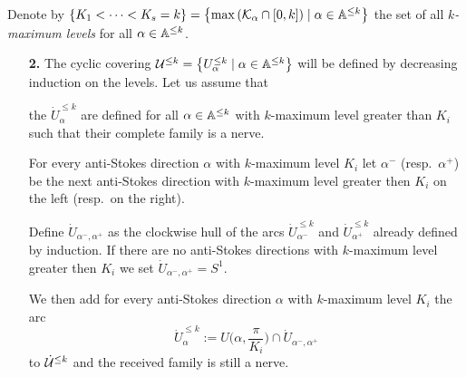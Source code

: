 Denote by $\left\{K_1<\cdots<K_s=k\right\}
=\left\{\max\left(\mathcal{K}_\alpha\cap[0,k]\right)\mid\alpha\in\mathbb{A}^{\leq k}\right\}$
the set of all \emph{$k$-maximum levels} for all $\alpha\in\mathbb{A}^{\leq k}$.
\begin{itemize}
\item[\textbf{2.}] The cyclic covering
  $\mathcal{U}^{\leq k}=\left\{U_\alpha^{\leq k}\mid\alpha\in\mathbb{A}^{\leq k}\right\}$
  will be defined by decreasing induction on the levels.
  Let us assume that
  \begin{einr}
    the $\dot U_\alpha^{\leq k}$ are defined for all $\alpha\in\mathbb{A}^{\leq k}$ with
    $k$-maximum level greater than $K_i$ such that their complete family is a
    nerve.
  \end{einr}
  For every anti-Stokes direction $\alpha$ with $k$-maximum level $K_i$ let
  $\alpha^-$ (resp.\ $\alpha^+$) be the next anti-Stokes direction with
  $k$-maximum level greater then $K_i$ on the left (resp.\ on the right).

  Define $\dot U_{\alpha^-,\alpha^+}$ as the clockwise hull of the arcs
  $\dot U_{\alpha^-}^{\leq k}$ and $\dot U_{\alpha^+}^{\leq k}$ already defined
  by induction.
  If there are no anti-Stokes directions with $k$-maximum level greater then
  $K_i$ we set $\dot U_{\alpha^-,\alpha^+}=S^1$.

  We then add for every anti-Stokes direction $\alpha$ with $k$-maximum level
  $K_i$ the arc
  \[
    \dot U_\alpha^{\leq k}
    :=U\bigl(\alpha,\frac{\pi}{K_i}\bigr)\cap\dot U_{\alpha^-,\alpha^+}
  \]
  to $\dot{\mathcal{U}}^{\leq k}$ and the received family is still a nerve.
  \begin{figure}[h]
    \begin{center}
\end{center}
\end{figure}
\end{itemize}
